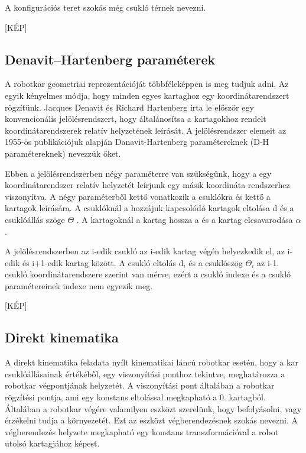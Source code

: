 A konfigurációs teret szokás még csukló térnek nevezni.

[KÉP]

\cite{Alatartsev:2015}
\subsection{Denavit–Hartenberg paraméterek}

A robotkar geometriai reprezentációját többféleképpen is meg tudjuk adni.
Az egyik kényelmes módja, hogy minden egyes kartaghoz egy koordinátarendszert rögzítünk. 
Jacques Denavit és Richard Hartenberg írta le először egy konvencionális jelölésrendszert, hogy általánosítsa a kartagokhoz rendelt koordinátarendszerek relatív helyzetének leírását. A jelölésrendszer elemeit az 1955-ös publikációjuk alapján Danavit-Hartenberg paramétereknek (D-H paramétereknek) nevezzük őket.

Ebben a jelölésrendszerben négy paraméterre van szükségünk, hogy a egy koordinátarendszer relatív helyzetét leírjunk egy másik koordináta rendszerhez viszonyítva. A négy paraméterből kettő vonatkozik a csuklókra és kettő a kartagok leírására. A csuklóknál a hozzájuk kapcsolódó kartagok eltolása d és a csuklóállás szöge $\Theta$ . A kartagoknál a kartag hossza a és a kartag elcsavarodása $\alpha$ .

A jelölésrendszerben az i-edik csukló az i-edik kartag végén helyezkedik el, az i-edik és i+1-edik  kartag között. A csukló eltolás d$_i$ és a csuklószög $\Theta_i$ az i-1. csukló koordinátarendszere szerint van mérve, ezért a csukló indexe és a csukló paramétereinek indexe nem egyezik meg.

[KÉP]


\cite{Siciliano:2007}


\subsection{Direkt kinematika}

A direkt kinematika feladata nyílt kinematikai láncú robotkar esetén, hogy a kar csuklóállásainak értékéből, egy viszonyítási ponthoz tekintve, meghatározza a robotkar végpontjának helyzetét. A viszonyítási pont általában a robotkar rögzítési pontja, ami egy konstans eltolással megkapható a 0. kartagból. Általában a robotkar végére valamilyen eszközt szerelünk, hogy befolyásolni, vagy érzékelni tudja a környezetét. Ezt az eszközt végberendezésnek szokás nevezni. A végberendezés helyzete megkapható egy konstans transzformációval a robot utolsó kartagjához képest.

